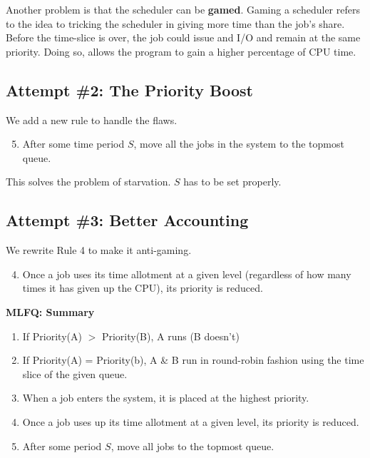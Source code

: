Another problem is that the scheduler can be \textbf{gamed}. Gaming a scheduler
refers to the idea to tricking the scheduler in giving more time than the job's
share. Before the time-slice is over, the job could issue and I/O and remain
at the same priority. Doing so, allows the program to gain a higher percentage
of CPU time.

\subsection{Attempt \#2: The Priority Boost}

We add a new rule to handle the flaws. 

\begin{enumerate}
        \setcounter{enumi}{4}
    \item After some time period $S$, move all the jobs in the system to the
        topmost queue.
\end{enumerate}

This solves the problem of starvation. $S$ has to be set properly.

\subsection{Attempt \#3: Better Accounting}

We rewrite Rule 4 to make it anti-gaming.

\begin{enumerate}
        \setcounter{enumi}{3}
    \item Once a job uses its time allotment at a given level (regardless of
        how many times it has given up the CPU), its priority is reduced.
\end{enumerate}

\begin{tcolorbox}
    \textbf{MLFQ: Summary}
    \begin{enumerate}
        \item If Priority(A) $>$ Priority(B), A runs (B doesn't)
        \item If Priority(A) = Priority(b), A \& B run in round-robin fashion
            using the time slice of the given queue.
        \item When a job enters the system, it is placed at the highest
            priority.
        \item Once a job uses up its time allotment at a given level, its
            priority is reduced.
        \item After some period $S$, move all jobs to the topmost queue.
    \end{enumerate}
\end{tcolorbox}
